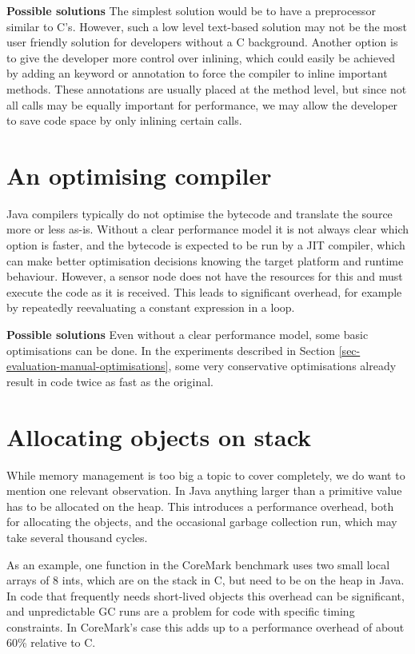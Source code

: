 \textbf{Possible solutions}
The simplest solution would be to have a preprocessor similar to C's. However, such a low level text-based solution may not be the most user friendly solution for developers without a C background.
Another option is to give the developer more control over inlining, which could easily be achieved by adding an  keyword or annotation to force the compiler to inline important methods. These annotations are usually placed at the method level, but since not all calls may be equally important for performance, we may allow the developer to save code space by only inlining certain calls.



\section{An optimising compiler}
\label{sec-optimising-javac}
Java compilers typically do not optimise the bytecode and translate the source more or less as-is. Without a clear performance model it is not always clear which option is faster, and the bytecode is expected to be run by a JIT compiler, which can make better optimisation decisions knowing the target platform and runtime behaviour. However, a sensor node does not have the resources for this and must execute the code as it is received. This leads to significant overhead, for example by repeatedly reevaluating a constant expression in a loop.

\textbf{Possible solutions}
Even without a clear performance model, some basic optimisations can be done. In the experiments described in Section \ref{sec-evaluation-manual-optimisations}, some very conservative optimisations already result in code twice as fast as the original.


\section{Allocating objects on stack}
\label{sec-no-gc}
While memory management is too big a topic to cover completely, we do want to mention one relevant observation. In Java anything larger than a primitive value has to be allocated on the heap. This introduces a performance overhead, both for allocating the objects, and the occasional garbage collection run, which may take several thousand cycles.

As an example, one function in the CoreMark benchmark uses two small local arrays of 8 ints, which are on the stack in C, but need to be on the heap in Java. In code that frequently needs short-lived objects this overhead can be significant, and unpredictable GC runs are a problem for code with specific timing constraints. In CoreMark's case this adds up to a performance overhead of about 60\% relative to C.

